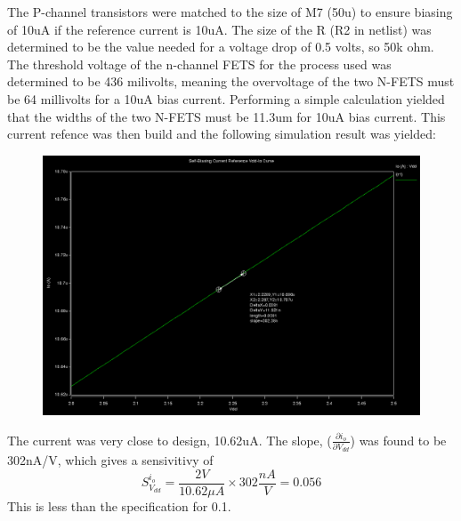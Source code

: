 \documentclass[12pt]{article}
\begin{document}
\FloatBarrier
The P-channel transistors were matched to the size of M7 (50u) to ensure biasing of 10uA if the reference current is 10uA. The size of the R (R2 in netlist) was determined to be the value needed for a voltage drop of 0.5 volts, so 50k ohm. The threshold voltage of the n-channel FETS for the process used was determined to be 436 milivolts, meaning the overvoltage of the two N-FETS must be 64 millivolts for a 10uA bias current. Performing a simple calculation yielded that the widths of the two N-FETS must be 11.3um for 10uA bias current. This current refence was then build and the following simulation result was yielded:
\FloatBarrier
\begin{figure}[h!]
\begin{center}
 \includegraphics[scale=0.3]{./curr.png}
\end{center}
\end{figure}
\FloatBarrier
The current was very close to design, 10.62uA. The slope, ($\frac{\partial i_o}{\partial V_{dd}}$) was found to be 302nA/V, which gives a sensivitivy of
\begin{equation}
S_{V_{dd}}^{i_o} = \frac{2 V}{10.62\mu A}\times 302\frac{nA}{V} = 0.056
\end{equation}
This is less than the specification for 0.1.
\end{document}
